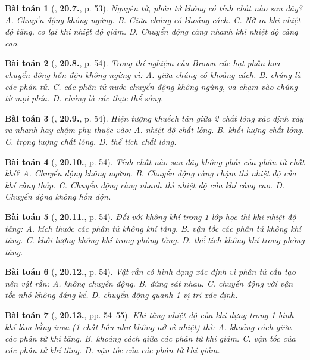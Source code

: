 \documentclass{article}
\numberwithin{equation}{section}
\newtheorem{baitoan}{Bài toán}
\begin{document}
\begin{baitoan}[\cite{SBT_Vat_Ly_8}, \textbf{20.7.}, p. 53]
	Nguyên tử, phân tử không có tính chất nào sau đây? {\sf A.} Chuyển động không ngừng. {\sf B.} Giữa chúng có khoảng cách. {\sf C.} Nở ra khi nhiệt độ tăng, co lại khi nhiệt độ giảm. {\sf D.} Chuyển động càng nhanh khi nhiệt độ càng cao.
\end{baitoan}

\begin{baitoan}[\cite{SBT_Vat_Ly_8}, \textbf{20.8.}, p. 54]
	Trong thí nghiệm của Brown các hạt phấn hoa chuyển động hỗn độn không ngừng vì: {\sf A.} giữa chúng có khoảng cách. {\sf B.} chúng là các phân tử. {\sf C.} các phân tử nước chuyển động không ngừng, va chạm vào chúng từ mọi phía. {\sf D.} chúng là các thực thể sống.
\end{baitoan}

\begin{baitoan}[\cite{SBT_Vat_Ly_8}, \textbf{20.9.}, p. 54]
	Hiện tượng khuếch tán giữa 2 chất lỏng xác định xảy ra nhanh hay chậm phụ thuộc vào: {\sf A.} nhiệt độ chất lỏng. {\sf B.} khối lượng chất lỏng. {\sf C.} trọng lượng chất lỏng. {\sf D.} thể  tích chất lỏng.
\end{baitoan}

\begin{baitoan}[\cite{SBT_Vat_Ly_8}, \textbf{20.10.}, p. 54]
	Tính chất nào sau đây không phải của phân tử chất khí? {\sf A.} Chuyển động không ngừng. {\sf B.} Chuyển động càng chậm thì nhiệt độ của khí càng thấp. {\sf C.} Chuyển động càng nhanh thì nhiệt độ của khí càng cao. {\sf D.} Chuyển động không hỗn độn.
\end{baitoan}

\begin{baitoan}[\cite{SBT_Vat_Ly_8}, \textbf{20.11.}, p. 54]
	Đối với không khí trong 1 lớp học thì khi nhiệt độ tăng: {\sf A.} kích thước các phân tử không khí tăng. {\sf B.} vận tốc các phân tử không khí tăng. {\sf C.} khối lượng không khí trong phòng tăng. {\sf D.} thể tích không khí trong phòng tăng.
\end{baitoan}

\begin{baitoan}[\cite{SBT_Vat_Ly_8}, \textbf{20.12.}, p. 54]
	Vật rắn có hình dạng xác định vì phân tử cấu tạo nên vật rắn: {\sf A.} không chuyển động. {\sf B.} đứng sát nhau. {\sf C.} chuyển động với vận tốc nhỏ không đáng kể. {\sf D.} chuyển động quanh 1 vị trí xác định.
\end{baitoan}

\begin{baitoan}[\cite{SBT_Vat_Ly_8}, \textbf{20.13.}, pp. 54--55]
	Khi tăng nhiệt độ của khí đựng trong 1 bình khí làm bằng inva (1 chất hầu như không nở vì nhiệt) thì: {\sf A.} khoảng cách giữa các phân tử khí tăng. {\sf B.} khoảng cách giữa các phân tử khí giảm. {\sf C.} vận tốc của các phân tử khí tăng. {\sf D.} vận tốc của các phân tử khí giảm.
\end{baitoan}
\end{document}
